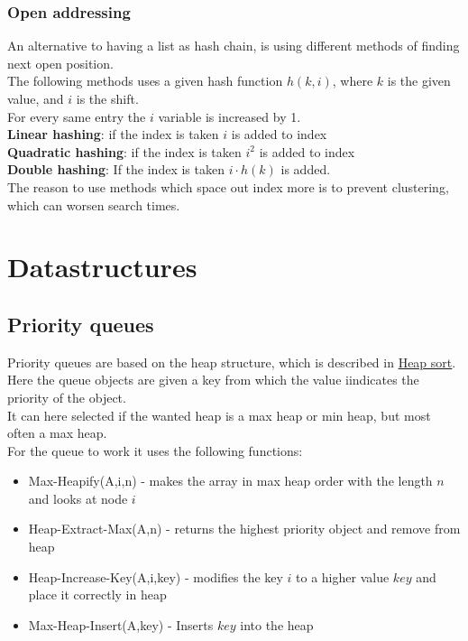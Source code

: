 \documentclass[12pt, a4paper]{article}
\begin{document}
				\subsubsection{Open addressing}
					An alternative to having a list as hash chain, is using different methods of finding next open position.\\
					The following methods uses a given hash function $h(k,i)$, where $k$ is the given value, and $i$ is the shift.\\
					For every same entry the $i$ variable is increased by 1.\\
					\textbf{Linear hashing}: if the index is taken $i$ is added to index\\
					\textbf{Quadratic hashing}: if the index is taken $i^2$ is added to index\\
					\textbf{Double hashing}: If the index is taken $i\cdot h(k)$ is added.\\
					The reason to use methods which space out index more is to prevent clustering, which can worsen search times.
		\section{Datastructures}
			\subsection{Priority queues}
				Priority queues are based on the heap structure, which is described in \hyperref[sec:HeapSort]{Heap sort}.\\
				Here the queue objects are given a key from which the value iindicates the priority of the object.\\
				It can here selected if the wanted heap is a max heap or min heap, but most often a max heap.\\
				For the queue to work it uses the following functions:
				\begin{itemize}
					\item Max-Heapify(A,i,n) - makes the array in max heap order with the length $n$ and looks at node $i$
					\item Heap-Extract-Max(A,n) - returns the highest priority object and remove from heap
					\item Heap-Increase-Key(A,i,key) - modifies the key $i$ to a higher value $key$ and place it correctly in heap
					\item Max-Heap-Insert(A,key) - Inserts $key$ into the heap
				\end{itemize}
\end{document}
